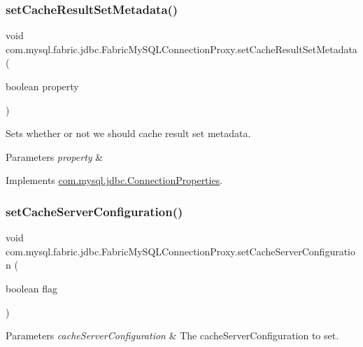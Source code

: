 \subsubsection{\texorpdfstring{set\+Cache\+Result\+Set\+Metadata()}{setCacheResultSetMetadata()}}
{\footnotesize\ttfamily void com.\+mysql.\+fabric.\+jdbc.\+Fabric\+My\+S\+Q\+L\+Connection\+Proxy.\+set\+Cache\+Result\+Set\+Metadata (\begin{DoxyParamCaption}\item[{boolean}]{property }\end{DoxyParamCaption})}

Sets whether or not we should cache result set metadata.


\begin{DoxyParams}{Parameters}
{\em property} & \\
\hline
\end{DoxyParams}


Implements \mbox{\hyperlink{interfacecom_1_1mysql_1_1jdbc_1_1_connection_properties_abf45e0839d48fe28bb22d334118f807f}{com.\+mysql.\+jdbc.\+Connection\+Properties}}.

\mbox{\label{classcom_1_1mysql_1_1fabric_1_1jdbc_1_1_fabric_my_s_q_l_connection_proxy_a6b6a1ccd6ab8f96f4d24702659774ab4}} 
\subsubsection{\texorpdfstring{set\+Cache\+Server\+Configuration()}{setCacheServerConfiguration()}}
{\footnotesize\ttfamily void com.\+mysql.\+fabric.\+jdbc.\+Fabric\+My\+S\+Q\+L\+Connection\+Proxy.\+set\+Cache\+Server\+Configuration (\begin{DoxyParamCaption}\item[{boolean}]{flag }\end{DoxyParamCaption})}


\begin{DoxyParams}{Parameters}
{\em cache\+Server\+Configuration} & The cache\+Server\+Configuration to set. \\
\hline
\end{DoxyParams}


